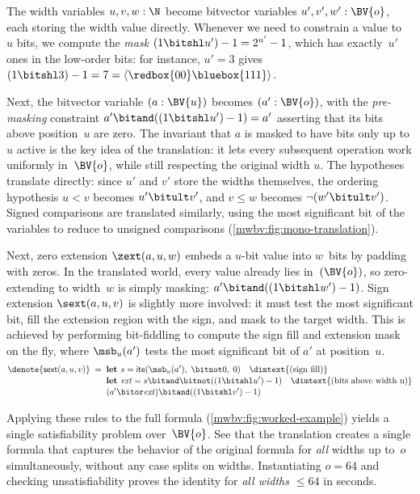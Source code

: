 The width variables $u, v, w : \N$ become bitvector variables
$u', v', w' : \BV{o}$, each storing the width value directly.
Whenever we need to constrain a value to~$u$ bits, we compute the
\emph{mask} $(1 \bitshl u') - 1 = 2^{u'} - 1$, which has exactly~$u'$
ones in the low-order bits: for instance, $u' = 3$ gives
$(1 \bitshl 3) - 1 = 7 = \langle\redbox{00}\bluebox{111}\rangle$.

Next, the bitvector variable $(a : \BV{u})$ becomes $(a' : \BV{o})$, with the
\emph{pre-masking} constraint $a' \bitand ((1 \bitshl u') - 1) = a'$ asserting
that its bits above position~$u$ are zero.
The invariant that $a$ is masked to have bits only up to $u$ active is
the key idea of the translation: it lets every subsequent operation work
uniformly in~$\BV{o}$, while still respecting the original width $u$.
%
The hypotheses translate directly: since $u'$ and $v'$ store the widths
themselves, the ordering hypothesis $u < v$ becomes $u' \bitult v'$,
and $v \leq w$ becomes $\neg(w' \bitult v')$. Signed comparisons are translated similarly,
using the most significant bit of the variables to reduce to unsigned comparisons (\cref{mwbv:fig:mono-translation}).

Next, zero extension $\zext(a, u, w)$
embeds a $u$-bit value into $w$~bits by padding with zeros. In the
translated world, every value already lies in~$(\BV{o})$, so zero-extending to
width~$w$ is simply masking: $a' \bitand ((1 \bitshl w') - 1)$. Sign extension
$\sext(a, u, v)$ is slightly more involved: it must test the most significant
bit, fill the extension region with the sign, and mask to the target width. This
is achieved by performing bit-fiddling to compute the sign fill and extension
mask on the fly, where $\msb_u(a')$ tests the most significant bit of $a'$ at position~$u$.
%
\begin{align*}
  \denote{\mathsf{sext}(a, u, v)} \;=\;\;
  &\textbf{let } s = \mathsf{ite}(\msb_u(a'),\; \bitnot 0,\; 0)
    \quad\text{\dimtext{(sign fill)}} \\[-2pt]
  &\textbf{let } \mathit{ext} = s \bitand \bitnot((1 \bitshl u') - 1)
    \quad\text{\dimtext{(bits above width~u)}} \\[-2pt]
  &(a' \bitor \mathit{ext}) \bitand ((1 \bitshl v') - 1)
\end{align*}

Applying these rules to the full formula
(\cref{mwbv:fig:worked-example}) yields a single \qfbv{}
satisfiability problem over~$\BV{o}$.
See that the translation creates a single formula that captures the behavior of the original formula for \emph{all} widths up to~$o$ simultaneously,
without any case splits on widths.
Instantiating $o = 64$ and checking unsatisfiability proves the identity for
\emph{all widths $\leq 64$} in seconds.

